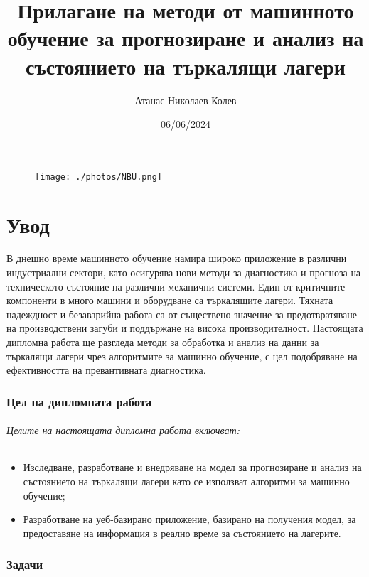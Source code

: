 \documentclass{article}
\title{Прилагане на методи от машинното обучение за прогнозиране и анализ на състоянието на търкалящи лагери}
\author{Атанас Николаев Колев}
\date{06/06/2024}
\begin{document}
\maketitle
\begin{figure}[h] %
    \centering
    \texttt{[image: ./photos/NBU.png]} %
    \label{fig:example-image}
\end{figure}
\newpage
\tableofcontents
\newpage
\part{Увод}
В днешно време машинното обучение намира широко приложение в различни индустриални сектори, като осигурява нови методи за диагностика и прогноза на техническото състояние на различни механични системи. Един от критичните компоненти в много машини и оборудване са търкалящите лагери. Тяхната надеждност и безаварийна работа са от съществено значение за предотвратяване на производствени загуби и поддържане на висока производителност. Настоящата дипломна работа ще разгледа методи за обработка и анализ на данни за търкалящи лагери чрез алгоритмите за машинно обучение, с цел подобряване на ефективността на превантивната диагностика.
\section{Цел на дипломната работа}
\paragraph{Целите на настоящата дипломна работа включват:}
\begin{itemize}
    \item Изследване, разработване и внедряване на модел за прогнозиране и анализ на състоянието на търкалящи лагери като се използват алгоритми за машинно обучение;
    \item Разработване на уеб-базирано приложение, базирано на получения модел, за предоставяне на информация в реално време за състоянието на лагерите.
\end{itemize}
\section{Задачи}
\end{document}

